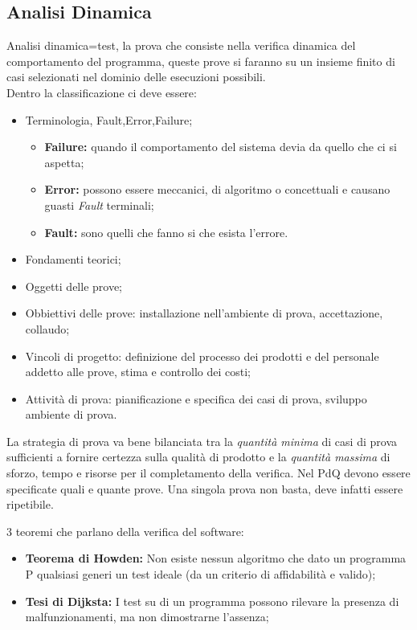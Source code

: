 \subsection{Analisi Dinamica}

Analisi dinamica=test, la prova che consiste nella verifica dinamica del comportamento del programma, queste prove si faranno su un insieme finito di casi selezionati nel dominio delle esecuzioni possibili.\\

Dentro la classificazione ci deve essere:

\begin{itemize}
	\item Terminologia, Fault,Error,Failure;
	\begin{itemize}
		\item \textbf{Failure:} quando il comportamento del sistema devia da quello che ci si aspetta;
		\item \textbf{Error:} possono essere meccanici, di algoritmo o concettuali e causano guasti \textit{Fault} terminali;
		\item \textbf{Fault:} sono quelli che fanno si che esista l'errore.
	\end{itemize}
	\item Fondamenti teorici;
	\item Oggetti delle prove;
	\item Obbiettivi delle prove: installazione nell'ambiente di prova, accettazione, collaudo;
	\item Vincoli di progetto: definizione del processo dei prodotti e del personale addetto alle prove, stima e controllo dei costi;
	\item Attività di prova: pianificazione e specifica dei casi di prova, sviluppo ambiente di prova.
\end{itemize}

La strategia di prova va bene bilanciata tra la \textit{quantità minima} di casi di prova sufficienti a fornire certezza sulla qualità di prodotto e la \textit{quantità massima} di sforzo, tempo e risorse per il completamento della verifica. Nel PdQ devono essere specificate quali e quante prove. Una singola prova non basta, deve infatti essere ripetibile.

3 teoremi che parlano della verifica del software:
\begin{itemize}
	\item \textbf{Teorema di Howden:} Non esiste nessun algoritmo che dato un programma P qualsiasi generi un test ideale (da un criterio di affidabilità e valido);
	\item \textbf{Tesi di Dijksta:} I test su di un programma possono rilevare la presenza di malfunzionamenti, ma non dimostrarne l'assenza;
\end{itemize}

